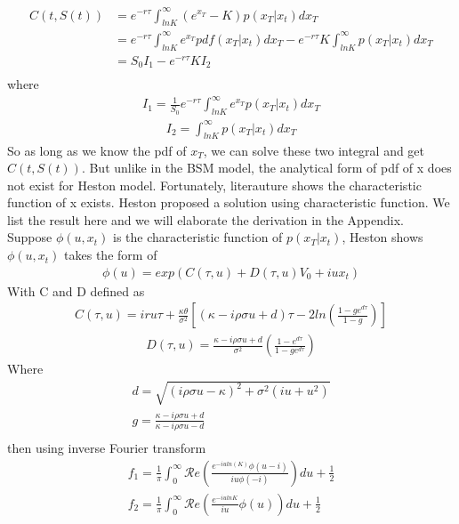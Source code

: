 \documentclass[a4paper]{article}
\begin{document}
\begin{align*}
	C(t, S(t)) & = e^{ -r \tau } \int_{lnK}^{\infty} (e^{x_T} - K) p(x_T| x_t) dx_T \\
		   & = e^{-r \tau}\int_{lnK}^{\infty} e^{x_T} pdf(x_T| x_t) dx_T 
		   - e^{-r\tau} K \int_{lnK}^{\infty}  p(x_T | x_t) dx_T \\
		   & = S_0 I_1 -  e^{-r \tau} K I_2\\
\end{align*}
where 
\begin{align}
	I_1 = \frac{1}{S_0} e^{-r \tau}\int_{lnK}^{\infty} e^{x_T} p(x_T | x_t) dx_T \label{I_1}
\end{align}
\begin{align}
	I_2 = \int_{lnK}^{\infty}  p(x_T | x_t) dx_T \label{I_2}
\end{align}
So as long as we know the pdf of $x_T$, we can solve these two integral and get $C(t, S(t))$. But unlike in the BSM model, the analytical form of pdf of x does not exist for Heston model. Fortunately, literauture shows the characteristic function of x exists. Heston \cite{heston} proposed a solution using characteristic function. We list the result here and we will elaborate the derivation in the Appendix. \\
Suppose $\phi(u, x_t)$ is the characteristic function of $p(x_T| x_t)$, Heston shows $\phi(u,x_t)$ takes the form of
\begin{align*}
	\phi(u) = exp(C(\tau, u) + D(\tau, u)V_0 + iux_t)
\end{align*}
With C and D defined as
\begin{align} 
	C(\tau, u) = iru\tau + \frac{\kappa \theta}{\sigma^2}
	[(\kappa - i\rho \sigma u + d)\tau - 2ln(\frac{1 - g e^{d\tau}}{1 - g})] \label{heston_C}
\end{align}
\begin{align} 
	D(\tau, u) = \frac{\kappa - i\rho \sigma u + d}{\sigma^2} (\frac{1 - e^{d\tau}}{1-ge^{d\tau}})
		\label{heston_D}
\end{align}
Where
\begin{align*}
	d = \sqrt{(i\rho \sigma u - \kappa)^2 + \sigma^2(i  u + u^2)} \\
	g = \frac{\kappa - i \rho \sigma u + d}{\kappa - i \rho \sigma u -d} \\
\end{align*}
then using inverse Fourier transform
\begin{align*}
	f_1 = \frac{1}{\pi} \int_{0}^{\infty}\mathcal Re(\frac{e^{-iuln(K)}\phi(u-i)}{iu\phi(-i)})du +\frac{1}{2} \\
	f_2 = \frac{1}{\pi} \int_{0}^{\infty}\mathcal Re( \frac{e^{-i u lnK}}{iu} \phi(u))  du + \frac{1}{2} \\
\end{align*}
\end{document}
